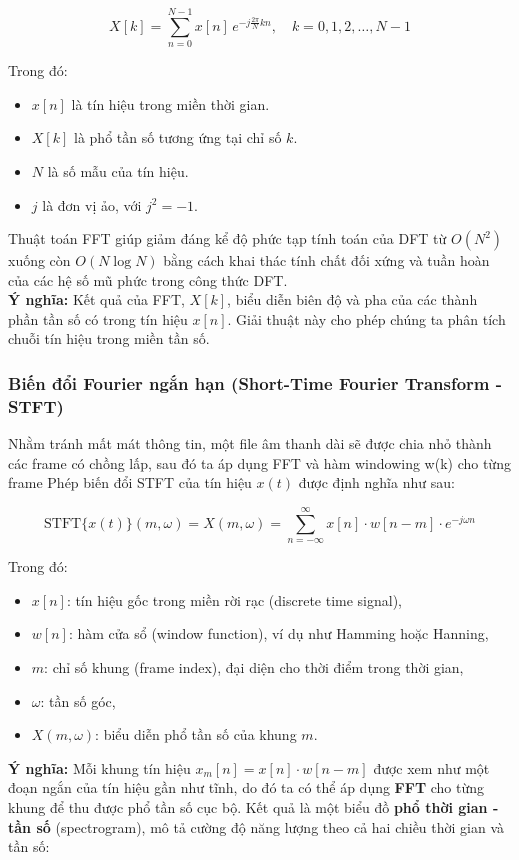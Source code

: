 \[
X[k] = \sum_{n=0}^{N-1} x[n] \, e^{-j \frac{2\pi}{N} kn}, \quad k = 0, 1, 2, \ldots, N-1
\]

Trong đó:
\begin{itemize}
    \item $x[n]$ là tín hiệu trong miền thời gian.
    \item $X[k]$ là phổ tần số tương ứng tại chỉ số $k$.
    \item $N$ là số mẫu của tín hiệu.
    \item $j$ là đơn vị ảo, với $j^2 = -1$.
\end{itemize}

Thuật toán FFT giúp giảm đáng kể độ phức tạp tính toán của DFT từ $O(N^2)$ xuống còn $O(N \log N)$ bằng cách khai thác tính chất đối xứng và tuần hoàn của các hệ số mũ phức trong công thức DFT.\\

\textbf{Ý nghĩa:} Kết quả của FFT, $X[k]$, biểu diễn biên độ và pha của các thành phần tần số có trong tín hiệu $x[n]$. 
Giải thuật này cho phép chúng ta phân tích chuỗi tín hiệu trong miền tần số.\\
\subsubsection{Biến đổi Fourier ngắn hạn (Short-Time Fourier Transform - STFT)}
Nhằm tránh mất mát thông tin, một file âm 
thanh dài sẽ được chia nhỏ thành các frame có chồng lấp, sau đó ta áp dụng FFT và hàm 
windowing w(k) cho từng frame
Phép biến đổi STFT của tín hiệu $x(t)$ được định nghĩa như sau:

\[
\text{STFT}\{x(t)\}(m, \omega) = X(m, \omega) = \sum_{n=-\infty}^{\infty} x[n] \cdot w[n - m] \cdot e^{-j \omega n}
\]

Trong đó:

\begin{itemize}
    \item $x[n]$: tín hiệu gốc trong miền rời rạc (discrete time signal),
    \item $w[n]$: hàm cửa sổ (window function), ví dụ như Hamming hoặc Hanning,
    \item $m$: chỉ số khung (frame index), đại diện cho thời điểm trong thời gian,
    \item $\omega$: tần số góc,
    \item $X(m, \omega)$: biểu diễn phổ tần số của khung $m$.
\end{itemize}

\textbf{Ý nghĩa:} Mỗi khung tín hiệu $x_m[n] = x[n] \cdot w[n - m]$ được xem như một đoạn ngắn của tín hiệu gần như tĩnh, do đó ta có thể áp dụng \textbf{FFT} cho từng khung để thu được phổ tần số cục bộ.  
Kết quả là một biểu đồ \textbf{phổ thời gian - tần số} (spectrogram), mô tả cường độ năng lượng theo cả hai chiều thời gian và tần số:

